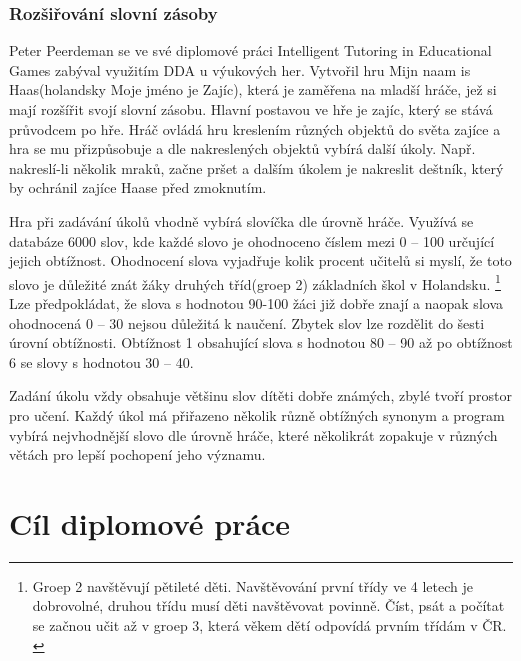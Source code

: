 \subsubsection{Rozšiřování slovní zásoby}

Peter Peerdeman se ve své diplomové práci Intelligent Tutoring in Educational Games\cite{14Haas} zabýval využitím DDA u výukových her. Vytvořil hru Mijn naam is Haas(holandsky Moje jméno je Zajíc), která je zaměřena na mladší hráče, jež si mají rozšířit svojí slovní zásobu. Hlavní postavou ve hře je zajíc, který se stává průvodcem po hře. Hráč ovládá hru kreslením různých objektů do světa zajíce a hra se mu přizpůsobuje a dle nakreslených objektů vybírá další úkoly. Např. nakreslí-li několik mraků, začne pršet a dalším úkolem je nakreslit deštník, který by ochránil zajíce Haase před zmoknutím.

Hra při zadávání úkolů vhodně vybírá slovíčka dle úrovně hráče. Využívá se databáze 6000 slov, kde každé slovo je ohodnoceno číslem mezi 0 – 100 určující jejich obtížnost. Ohodnocení slova vyjadřuje kolik procent učitelů si myslí, že toto slovo je důležité znát žáky druhých tříd(groep  2)  základních škol v Holandsku. \footnote{Groep 2 navštěvují pětileté děti. Navštěvování první třídy ve 4 letech je dobrovolné, druhou třídu musí děti navštěvovat povinně. Číst, psát a počítat se začnou učit až v groep 3, která věkem dětí odpovídá prvním třídám v ČR. \cite{27EdHolland}} Lze předpokládat, že slova s hodnotou 90-100 žáci již dobře znají a naopak slova ohodnocená 0 – 30 nejsou důležitá k naučení. Zbytek slov lze rozdělit do šesti úrovní obtížnosti. Obtížnost 1 obsahující slova s hodnotou 80 – 90 až po obtížnost 6 se slovy s hodnotou 30 – 40.

Zadání úkolu vždy obsahuje většinu slov dítěti dobře známých, zbylé tvoří prostor pro učení. Každý úkol má přiřazeno několik různě obtížných synonym a program vybírá nejvhodnější slovo dle úrovně hráče, které několikrát zopakuje v různých větách pro lepší pochopení jeho významu.

\section{Cíl diplomové práce}

\endinput
